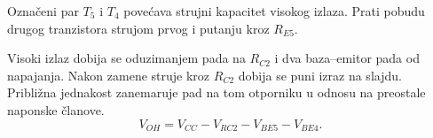 Označeni par $T_5$ i $T_4$ povećava strujni kapacitet visokog izlaza. Prati pobudu drugog tranzistora strujom prvog i putanju kroz $R_{E5}$.

Visoki izlaz dobija se oduzimanjem pada na $R_{C2}$ i dva baza–emitor pada od napajanja. Nakon zamene struje kroz $R_{C2}$ dobija se puni izraz na slajdu. Približna jednakost zanemaruje pad na tom otporniku u odnosu na preostale naponske članove.
\[V_{OH}=V_{CC}-V_{RC2}-V_{BE5}-V_{BE4}.\]
